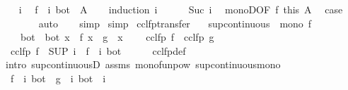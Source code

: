 \begin{isabellebody}
\ \ \isamarkupfalse%
\ i\ \isamarkupfalse%
\ {\isachardoublequoteopen}{\isacharparenleft}f\ {\isacharcircum}{\isacharcircum}\ i{\isacharparenright}\ bot\ {\isasymle}\ A{\isachardoublequoteclose}\isanewline
\ \ \isamarkupfalse%
\ {\isacharparenleft}induction\ i{\isacharparenright}\isanewline
\ \ \ \ \isamarkupfalse%
\ {\isacharparenleft}Suc\ i{\isacharparenright}\ \isamarkupfalse%
\ monoD{\isacharbrackleft}OF\ f\ this{\isacharbrackright}\ A\ \isamarkupfalse%
\ {\isacharquery}case\isanewline
\ \ \ \ \ \ \isamarkupfalse%
\ auto\isanewline
\ \ \isamarkupfalse%
\ simp\isanewline
{}\isamarkupfalse%
\ simp%
\endisatagproof
{\isafoldproof}%
%
\isadelimproof
\isanewline
%
\endisadelimproof
\isanewline
{}\isamarkupfalse%
\ cclfp{\isacharunderscore}transfer{\isacharcolon}\isanewline
\ \ \ {\isachardoublequoteopen}sup{\isacharunderscore}continuous\ {\isasymalpha}{\isachardoublequoteclose}\ {\isachardoublequoteopen}mono\ f{\isachardoublequoteclose}\isanewline
\ \ \ {\isachardoublequoteopen}{\isasymalpha}\ bot\ {\isacharequal}\ bot{\isachardoublequoteclose}\ {\isachardoublequoteopen}{\isasymAnd}x{\isachardot}\ {\isasymalpha}\ {\isacharparenleft}f\ x{\isacharparenright}\ {\isacharequal}\ g\ {\isacharparenleft}{\isasymalpha}\ x{\isacharparenright}{\isachardoublequoteclose}\isanewline
\ \ \ {\isachardoublequoteopen}{\isasymalpha}\ {\isacharparenleft}cclfp\ f{\isacharparenright}\ {\isacharequal}\ cclfp\ g{\isachardoublequoteclose}\isanewline
%
\isadelimproof
%
\endisadelimproof
%
\isatagproof
{}\isamarkupfalse%
\ {\isacharminus}\isanewline
\ \ \isamarkupfalse%
\ {\isachardoublequoteopen}{\isasymalpha}\ {\isacharparenleft}cclfp\ f{\isacharparenright}\ {\isacharequal}\ {\isacharparenleft}SUP\ i{\isachardot}\ {\isasymalpha}\ {\isacharparenleft}{\isacharparenleft}f\ {\isacharcircum}{\isacharcircum}\ i{\isacharparenright}\ bot{\isacharparenright}{\isacharparenright}{\isachardoublequoteclose}\isanewline
\ \ \ \ \isamarkupfalse%
\ cclfp{\isacharunderscore}def\ \isamarkupfalse%
\ {\isacharparenleft}intro\ sup{\isacharunderscore}continuousD\ assms\ mono{\isacharunderscore}funpow\ sup{\isacharunderscore}continuous{\isacharunderscore}mono{\isacharparenright}\isanewline
\ \ \isamarkupfalse%
\ \isamarkupfalse%
\ {\isachardoublequoteopen}{\isasymalpha}\ {\isacharparenleft}{\isacharparenleft}f\ {\isacharcircum}{\isacharcircum}\ i{\isacharparenright}\ bot{\isacharparenright}\ {\isacharequal}\ {\isacharparenleft}g\ {\isacharcircum}{\isacharcircum}\ i{\isacharparenright}\ bot{\isachardoublequoteclose}\ \ i\isanewline

\end{isabellebody}
